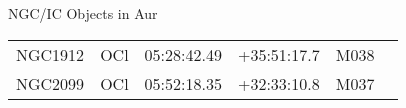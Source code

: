 \begin{block}{NGC/IC Objects in Aur}
  \centering
  \begin{tabularx}{\textwidth}{llrrll} \toprule 
    NGC1912 & OCl & 05:28:42.49 & +35:51:17.7  & M038 \\ 
    NGC2099 & OCl & 05:52:18.35 & +32:33:10.8  & M037 \\ 
  \end{tabularx}
\end{block}